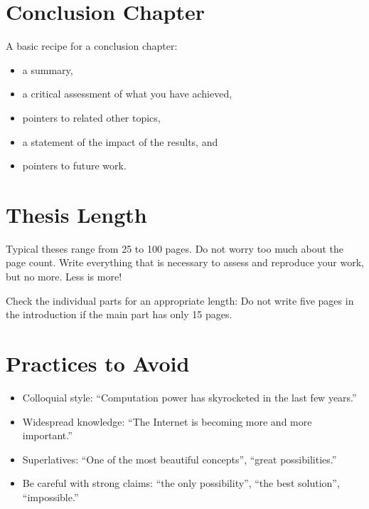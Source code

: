 \section{Conclusion Chapter}

A basic recipe for a conclusion chapter:
\begin{itemize}
\item a summary,
\item a critical assessment of what you have achieved,
\item pointers to related other topics,
\item a statement of the impact of the results, and
\item pointers to future work.
\end{itemize}

\section{Thesis Length}

Typical theses range from 25 to 100 pages. Do not worry too much about the page count. Write everything that is necessary to assess and reproduce your work, but no more. Less is more!

Check the individual parts for an appropriate length: Do not write five pages in the introduction if the main part has only 15 pages.


\section{Practices to Avoid}

\begin{itemize}
\item Colloquial style: “Computation power has skyrocketed in the last few years.”
\item Widespread knowledge: “The Internet is becoming more and more important.”
\item Superlatives: “One of the most beautiful concepts”, “great possibilities.”
\item Be careful with strong claims: “the only possibility”, “the best solution”, “impossible.”
\end{itemize}